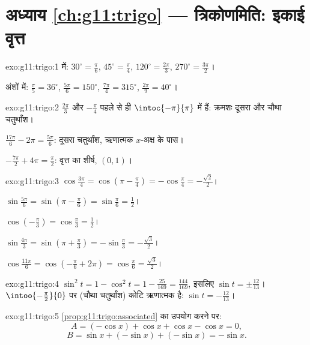 \section*{अध्याय \ref{ch:g11:trigo} --- त्रिकोणमिति: इकाई वृत्त}

\begin{solution}{exo:g11:trigo:1}
 में: $30^\circ = \frac{\pi}{6}$, $45^\circ = \frac{\pi}{4}$, $120^\circ = \frac{2\pi}{3}$, $270^\circ = \frac{3\pi}{2}$।

अंशों में: $\frac{\pi}{5} = 36^\circ$, $\frac{5\pi}{6} = 150^\circ$, $\frac{7\pi}{4} = 315^\circ$, $\frac{2\pi}{9} = 40^\circ$।
\end{solution}

\begin{solution}{exo:g11:trigo:2}
$\frac{2\pi}{3}$ और $-\frac{\pi}{4}$ पहले से ही $\intoc{-\pi}{\pi}$ में हैं: क्रमशः दूसरा और चौथा चतुर्थांश।

$\frac{17\pi}{6} - 2\pi = \frac{5\pi}{6}$: दूसरा चतुर्थांश, ऋणात्मक $x$-अक्ष के पास।

$-\frac{7\pi}{2} + 4\pi = \frac{\pi}{2}$: वृत्त का शीर्ष, $(0, 1)$।
\end{solution}

\begin{solution}{exo:g11:trigo:3}
$\cos\frac{3\pi}{4} = \cos\left(\pi - \frac\pi4\right)
= -\cos\frac\pi4 = -\frac{\sqrt2}{2}$।

$\sin\frac{5\pi}{6} = \sin\left(\pi - \frac\pi6\right)
= \sin\frac\pi6 = \frac12$।

$\cos\left(-\frac\pi3\right) = \cos\frac\pi3 = \frac12$।

$\sin\frac{4\pi}{3} = \sin\left(\pi + \frac\pi3\right)
= -\sin\frac\pi3 = -\frac{\sqrt3}{2}$।

$\cos\frac{11\pi}{6} = \cos\left(-\frac\pi6 + 2\pi\right)
= \cos\frac\pi6 = \frac{\sqrt3}{2}$।
\end{solution}

\begin{solution}{exo:g11:trigo:4}
$\sin^2 t = 1 - \cos^2 t = 1 - \frac{25}{169} = \frac{144}{169}$, इसलिए $\sin t = \pm\frac{12}{13}$। $\intoo{-\frac\pi2}{0}$ पर (चौथा चतुर्थांश) कोटि ऋणात्मक है: $\sin t = -\frac{12}{13}$।
\end{solution}

\begin{solution}{exo:g11:trigo:5}
\cref{prop:g11:trigo:associated} का उपयोग करने पर:
\[
A = (-\cos x) + \cos x + \cos x - \cos x = 0 ,
\]
\[
B = \sin x + (-\sin x) + (-\sin x) = -\sin x .
\]
\end{solution}

